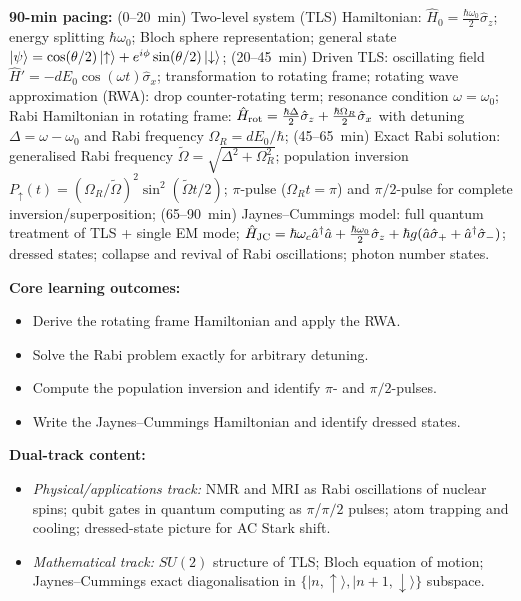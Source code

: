 \documentclass[11pt,a4paper]{article}
\begin{document}
\begin{tcolorbox}[modulebox, title={Module~I.4 / L04: Rabi Model and Two-Level Systems}]
\textbf{90-min pacing:} (0--20~min) Two-level system (TLS) Hamiltonian:
$\hat{H}_0=\tfrac{\hbar\omega_0}{2}\hat\sigma_z$; energy splitting $\hbar\omega_0$;
Bloch sphere representation; general state $\ket{\psi}=\cos(\theta/2)\ket{\uparrow}+e^{i\phi}\sin(\theta/2)\ket{\downarrow}$;
(20--45~min) Driven TLS: oscillating field $\hat{H}'=-d E_0\cos(\omega t)\hat\sigma_x$;
transformation to rotating frame; rotating wave approximation (RWA):
drop counter-rotating term; resonance condition $\omega=\omega_0$;
Rabi Hamiltonian in rotating frame: $\hat{H}_{\rm rot}=\tfrac{\hbar\Delta}{2}\hat\sigma_z+\tfrac{\hbar\Omega_R}{2}\hat\sigma_x$
with detuning $\Delta=\omega-\omega_0$ and Rabi frequency $\Omega_R=dE_0/\hbar$;
(45--65~min) Exact Rabi solution: generalised Rabi frequency $\tilde\Omega=\sqrt{\Delta^2+\Omega_R^2}$;
population inversion $P_{\uparrow}(t)=(\Omega_R/\tilde\Omega)^2\sin^2(\tilde\Omega t/2)$;
$\pi$-pulse ($\Omega_R t=\pi$) and $\pi/2$-pulse for complete inversion/superposition;
(65--90~min) Jaynes--Cummings model: full quantum treatment of TLS + single EM mode;
$\hat{H}_{\rm JC}=\hbar\omega_c\hat{a}^\dagger\hat{a}+\tfrac{\hbar\omega_0}{2}\hat\sigma_z+\hbar g(\hat{a}\hat\sigma_++\hat{a}^\dagger\hat\sigma_-)$;
dressed states; collapse and revival of Rabi oscillations; photon number states.

\medskip\textbf{Core learning outcomes:}
\begin{itemize}[leftmargin=1.4em,topsep=2pt,itemsep=1pt]
  \item Derive the rotating frame Hamiltonian and apply the RWA.
  \item Solve the Rabi problem exactly for arbitrary detuning.
  \item Compute the population inversion and identify $\pi$- and $\pi/2$-pulses.
  \item Write the Jaynes--Cummings Hamiltonian and identify dressed states.
\end{itemize}

\medskip\textbf{Dual-track content:}
\begin{itemize}[leftmargin=1.4em,topsep=2pt,itemsep=1pt]
  \item \textit{Physical/applications track:} NMR and MRI as Rabi oscillations of nuclear spins;
    qubit gates in quantum computing as $\pi$/$\pi/2$ pulses; atom trapping and cooling;
    dressed-state picture for AC Stark shift.
  \item \textit{Mathematical track:} $SU(2)$ structure of TLS; Bloch equation of motion;
    Jaynes--Cummings exact diagonalisation in $\{|n,\uparrow\rangle,|n+1,\downarrow\rangle\}$ subspace.
\end{itemize}


\end{tcolorbox}
\end{document}
